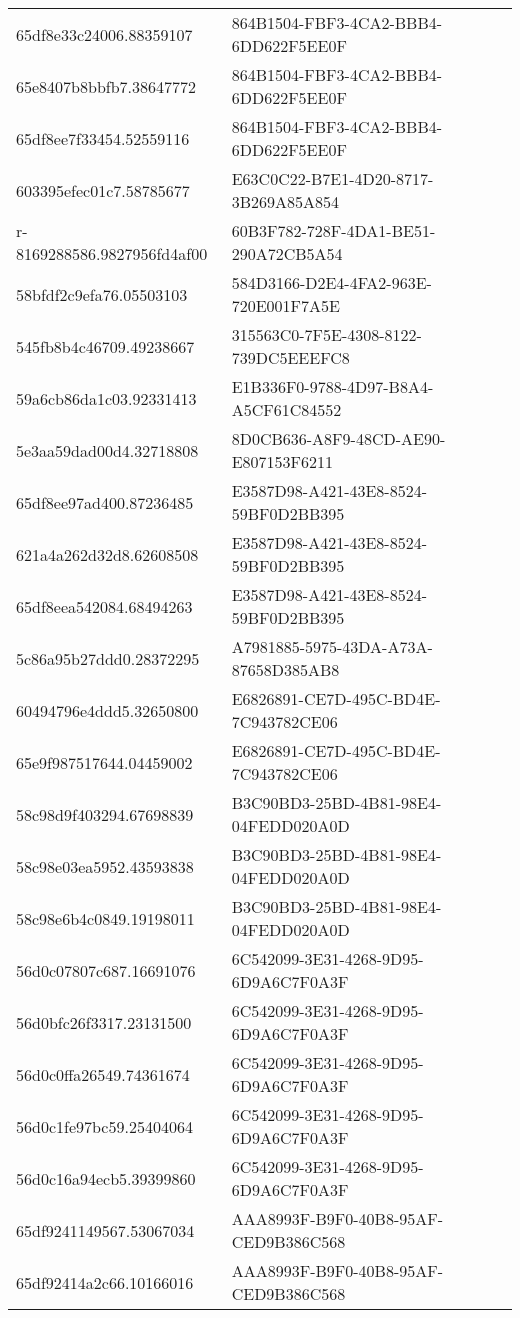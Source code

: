 \begin{tabular}{ll}
65df8e33c24006.88359107 & 864B1504-FBF3-4CA2-BBB4-6DD622F5EE0F \\
65e8407b8bbfb7.38647772 & 864B1504-FBF3-4CA2-BBB4-6DD622F5EE0F \\
65df8ee7f33454.52559116 & 864B1504-FBF3-4CA2-BBB4-6DD622F5EE0F \\
603395efec01c7.58785677 & E63C0C22-B7E1-4D20-8717-3B269A85A854 \\
r-8169288586.9827956fd4af00 & 60B3F782-728F-4DA1-BE51-290A72CB5A54 \\
58bfdf2c9efa76.05503103 & 584D3166-D2E4-4FA2-963E-720E001F7A5E \\
545fb8b4c46709.49238667 & 315563C0-7F5E-4308-8122-739DC5EEEFC8 \\
59a6cb86da1c03.92331413 & E1B336F0-9788-4D97-B8A4-A5CF61C84552 \\
5e3aa59dad00d4.32718808 & 8D0CB636-A8F9-48CD-AE90-E807153F6211 \\
65df8ee97ad400.87236485 & E3587D98-A421-43E8-8524-59BF0D2BB395 \\
621a4a262d32d8.62608508 & E3587D98-A421-43E8-8524-59BF0D2BB395 \\
65df8eea542084.68494263 & E3587D98-A421-43E8-8524-59BF0D2BB395 \\
5c86a95b27ddd0.28372295 & A7981885-5975-43DA-A73A-87658D385AB8 \\
60494796e4ddd5.32650800 & E6826891-CE7D-495C-BD4E-7C943782CE06 \\
65e9f987517644.04459002 & E6826891-CE7D-495C-BD4E-7C943782CE06 \\
58c98d9f403294.67698839 & B3C90BD3-25BD-4B81-98E4-04FEDD020A0D \\
58c98e03ea5952.43593838 & B3C90BD3-25BD-4B81-98E4-04FEDD020A0D \\
58c98e6b4c0849.19198011 & B3C90BD3-25BD-4B81-98E4-04FEDD020A0D \\
56d0c07807c687.16691076 & 6C542099-3E31-4268-9D95-6D9A6C7F0A3F \\
56d0bfc26f3317.23131500 & 6C542099-3E31-4268-9D95-6D9A6C7F0A3F \\
56d0c0ffa26549.74361674 & 6C542099-3E31-4268-9D95-6D9A6C7F0A3F \\
56d0c1fe97bc59.25404064 & 6C542099-3E31-4268-9D95-6D9A6C7F0A3F \\
56d0c16a94ecb5.39399860 & 6C542099-3E31-4268-9D95-6D9A6C7F0A3F \\
65df9241149567.53067034 & AAA8993F-B9F0-40B8-95AF-CED9B386C568 \\
65df92414a2c66.10166016 & AAA8993F-B9F0-40B8-95AF-CED9B386C568 \\

\end{tabular}

